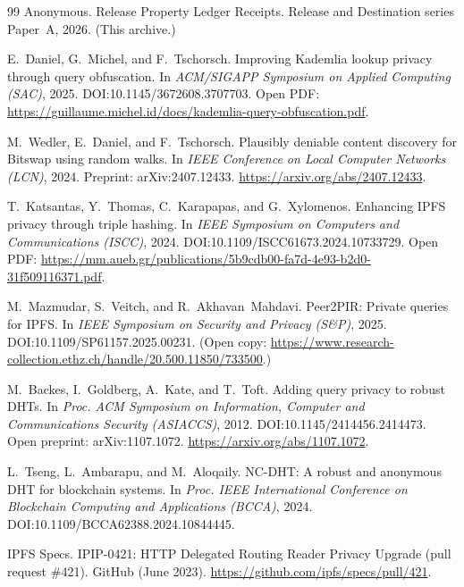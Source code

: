 \documentclass[11pt]{article}
\begin{document}
\begin{thebibliography}{99}
Anonymous.
\newblock Release Property Ledger Receipts.
\newblock Release and Destination series Paper~A, 2026. (This archive.)

E.~Daniel, G.~Michel, and F.~Tschorsch.
\newblock Improving Kademlia lookup privacy through query obfuscation.
\newblock In \emph{ACM/SIGAPP Symposium on Applied Computing (SAC)}, 2025.
\newblock DOI:10.1145/3672608.3707703.
\newblock Open PDF: \url{https://guillaume.michel.id/docs/kademlia-query-obfuscation.pdf}.

M.~Wedler, E.~Daniel, and F.~Tschorsch.
\newblock Plausibly deniable content discovery for Bitswap using random walks.
\newblock In \emph{IEEE Conference on Local Computer Networks (LCN)}, 2024.
\newblock Preprint: arXiv:2407.12433. \url{https://arxiv.org/abs/2407.12433}.

T.~Katsantas, Y.~Thomas, C.~Karapapas, and G.~Xylomenos.
\newblock Enhancing IPFS privacy through triple hashing.
\newblock In \emph{IEEE Symposium on Computers and Communications (ISCC)}, 2024.
\newblock DOI:10.1109/ISCC61673.2024.10733729.
\newblock Open PDF: \url{https://mm.aueb.gr/publications/5b9cdb00-fa7d-4e93-b2d0-31f509116371.pdf}.


M.~Mazmudar, S.~Veitch, and R.~Akhavan~Mahdavi.
\newblock Peer2PIR: Private queries for IPFS.
\newblock In \emph{IEEE Symposium on Security and Privacy (S\&P)}, 2025.
\newblock DOI:10.1109/SP61157.2025.00231.
\newblock (Open copy: \url{https://www.research-collection.ethz.ch/handle/20.500.11850/733500}.)

M.~Backes, I.~Goldberg, A.~Kate, and T.~Toft.
\newblock Adding query privacy to robust DHTs.
\newblock In \emph{Proc. ACM Symposium on Information, Computer and Communications Security (ASIACCS)}, 2012.
\newblock DOI:10.1145/2414456.2414473.
\newblock Open preprint: arXiv:1107.1072. \url{https://arxiv.org/abs/1107.1072}.


L.~Tseng, L.~Ambarapu, and M.~Aloqaily.
\newblock NC-DHT: A robust and anonymous DHT for blockchain systems.
\newblock In \emph{Proc. IEEE International Conference on Blockchain Computing and Applications (BCCA)}, 2024.
\newblock DOI:10.1109/BCCA62388.2024.10844445.


IPFS Specs.
\newblock IPIP-0421: HTTP Delegated Routing Reader Privacy Upgrade (pull request \#421).
\newblock GitHub (June 2023).
\newblock \url{https://github.com/ipfs/specs/pull/421}.


\end{thebibliography}
\end{document}
